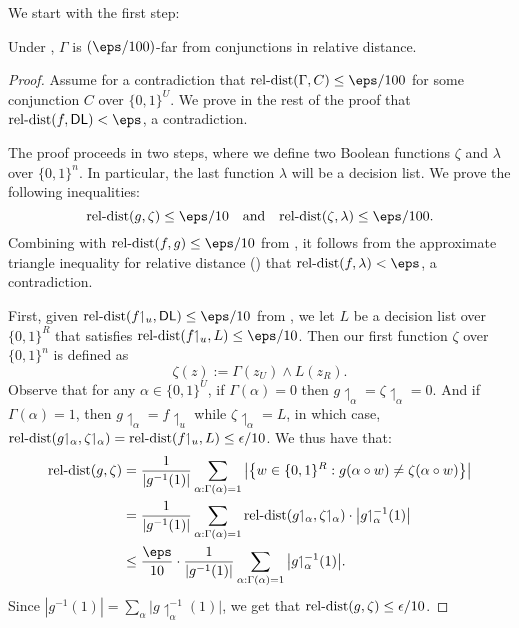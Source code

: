 \documentclass[11pt]{article}
\theoremstyle{definition}
\begin{document}
We start with the first step:
\begin{lemma}\label{thm: f would be close to DL}
Under 
  , $\Gamma$
  is $(\eps/100)$-far from conjunctions in relative distance.
\end{lemma}
\begin{proof}
Assume for a contradiction that $\reldist(\Gamma,C)\le \eps/100$
  for some conjunction $C$ over $\{0,1\}^U$.
We prove in the rest of the proof that $\reldist(f,\textsf{DL})< \eps$, a contradiction.





    The proof proceeds in two steps, where we define 
      two Boolean functions $\zeta$ and $\lambda$ over $\{0,1\}^n$.
    In particular, the last function $\lambda$ will be a decision list.
    We prove the following inequalities: 
$$  \reldist(g,\zeta)\le \eps/10 \quad\text{and}\quad\reldist(\zeta,\lambda)\le \eps/100 .$$
Combining with $\reldist(f,g)\le \eps/10 $ from
  ,  it follows from  
  the approximate triangle inequality for relative distance () that  $\reldist(f,\lambda)<\eps$, a contradiction.
    




    
First, given $\reldist(f{\upharpoonleft_{u}},\textsf{DL})\le \eps/10 $ from , we let $L$ be a decision list over $\{0,1\}^R$ that satisfies $\reldist(f{\upharpoonleft_{u}},L)\le \eps/10 $.
Then our first function
$\zeta$ over $\{0,1\}^n$ is defined as $$\zeta(z) :=\Gamma(z_U){\wedge} L(z_{ R}).$$    
Observe that for any $\alpha \in \{0,1\}^{U}$, if $\Gamma(\alpha)=0$ then $g{\upharpoonleft_\alpha}=\zeta{\upharpoonleft_\alpha}=0$. And if $\Gamma(\alpha)=1$, then $g{\upharpoonleft_\alpha}=f{\upharpoonleft_{ u}}$ while $\zeta{\upharpoonleft_\alpha}=L$, in which case, ${\mathrm{rel}\text{-}\mathrm{dist}(g{\upharpoonleft_\alpha}, \zeta{\upharpoonleft_\alpha} )}=\mathrm{rel}\text{-}\mathrm{dist}(f{\upharpoonleft_{ u}}, L) \leq \epsilon/10 $. We thus have that:
     \begin{align*}
        \reldist(g, \zeta)&=\frac{1}{|g^{-1}(1)|} \sum_{\alpha: \Gamma(\alpha)=1} \left| \big\{w \in \{0,1\}^R:g(\alpha\circ w) \neq \zeta(\alpha\circ w)\big\}\right| \\
        &= \frac{1}{|g^{-1}(1)|} \sum_{\alpha:\Gamma(\alpha)=1} \reldist(g{\upharpoonleft_\alpha}, \zeta{\upharpoonleft_\alpha}) \cdot \big|g{\upharpoonleft_\alpha^{-1}}(1)\big| \\
        &\leq \frac{\eps}{10 }\cdot \frac{1}{|g^{-1}(1)|} \sum_{\alpha:\Gamma(\alpha)=1} \big|g{\upharpoonleft_\alpha^{-1}}(1)\big|.
    \end{align*}
Since $|g^{-1}(1)|=\sum_{\alpha }|g{\upharpoonleft_\alpha^{-1}}(1)|$, we get that $\mathrm{rel}\text{-}\mathrm{dist}(g, \zeta) \leq \epsilon/10$.



\end{proof}
\end{document}
